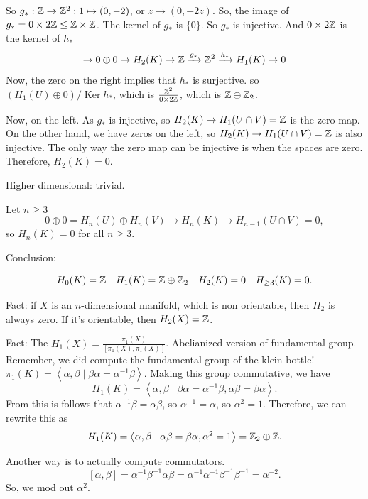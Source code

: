         So $g_*: \mathbb{Z} \to  \mathbb{Z}^2: 1 \mapsto (0, -2)$, or $z \to  (0, -2 z)$.
        So, the image of $g_* = 0 \times 2 \mathbb{Z} \le  \mathbb{Z}\times \mathbb{Z}$.
        The kernel of $g_*$ is $\{0\}$.
        So $g_*$ is injective.
        And $0 \times  2 \mathbb{Z}$ is the kernel of $h_*$
        \[
                    \to  0 \oplus 0 \to  H_2(K) \to  \mathbb{Z} \xrightarrow{g_*}   \mathbb{Z}^2 \xrightarrow{h_*}   H_1(K) \to  0
        \]
        Now, the zero on the right implies that $h_*$ is surjective.
        so $(H_1(U) \oplus 0) / \operatorname{Ker} h_*$, which is $\frac{\mathbb{Z}^2}{0 \times 2 \mathbb{Z}}$, which is $\mathbb{Z} \oplus \mathbb{Z}_2$.

        Now, on the left.
        As $g_*$ is injective, so $H_2(K) \to  H_1(U \cap V) = \mathbb{Z}$ is the zero map.
        On the other hand, we have zeros on the left, so $H_2(K) \to  H_1(U \cap V) = \mathbb{Z}$ is also injective.
        The only way the zero map can be injective is when the spaces are zero.
        Therefore, $H_2(K) = 0$.

        Higher dimensional: trivial.

        Let $n \ge  3$
        \[
            0 \oplus 0 = H_n(U) \oplus H_n(V) \to  H_n(K) \to H_{n-1}(U \cap V) = 0
        ,\] 
        so $H_n(K) = 0$ for all $n \ge  3$.

        Conclusion:

        \[
            H_0(K) = \mathbb{Z} \quad 
            H_1(K) = \mathbb{Z} \oplus \mathbb{Z}_2 \quad 
            H_2(K) = 0 \quad 
            H_{\ge 3}(K) = 0
        .\] 

        \begin{remark}
            Fact: if $X$ is an $n$-dimensional manifold, which is non orientable, then $H_2$ is always zero.
            If it's orientable, then  $H_2(X) = \mathbb{Z}$.
        \end{remark}

        \begin{remark}
            Fact: The $H_1(X) = \frac{\pi_1(X)}{[\pi_1(X), \pi_1(X)]}$.
            Abelianized version of fundamental group.
            Remember, we did compute the fundamental group of the klein bottle!
            $\pi_1(K) = \left<\alpha, \beta  \mid  \beta \alpha = \alpha^{-1} \beta \right>$.
            Making this group commutative, we have
            \[
                H_1(K) = \left<\alpha, \beta  \mid  \beta\alpha = \alpha^{-1} \beta, \alpha\beta = \beta\alpha \right>
            .\] 
            From this is follows that $\alpha^{-1} \beta = \alpha \beta$, so $\alpha^{-1} = \alpha$, so $\alpha^2 = 1$.
            Therefore, we can rewrite this as
            \[
                H_1(K) = \left<\alpha, \beta  \mid  \alpha\beta = \beta\alpha, \alpha^2 = 1 \right> = \mathbb{Z}_2 \oplus \mathbb{Z}
            .\] 

            Another way is to actually compute commutators.
            \[
                [\alpha, \beta] = \alpha^{-1}\beta^{-1} \alpha \beta = 
                \alpha^{-1} \alpha^{-1} \beta^{-1} \beta^{-1} = \alpha^{-2}
            .\] 
            So, we mod out $\alpha^2$.
        \end{remark}

